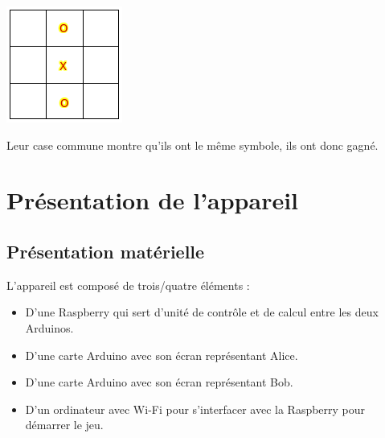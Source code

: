 \documentclass[11pt]{article}
\begin{document}
\includegraphics[width=\textwidth]{gridbob.png}

Leur case commune montre qu'ils ont le même symbole, ils ont donc gagné.

\newpage

\section{Présentation de l'appareil}

\subsection{Présentation matérielle}

L'appareil est composé de trois/quatre éléments :

\begin{itemize}
\item D'une Raspberry qui sert d'unité de contrôle et de calcul entre les deux Arduinos.
\item D'une carte Arduino avec son écran représentant Alice.
\item D'une carte Arduino avec son écran représentant Bob.
\item D'un ordinateur avec Wi-Fi pour s'interfacer avec la Raspberry pour démarrer le jeu.
\end{itemize}
\end{document}
